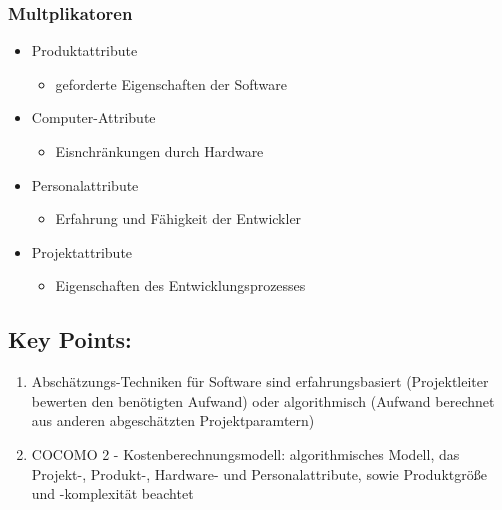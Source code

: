 \subsubsection{Multplikatoren}
\begin{itemize}
    \item Produktattribute
    \begin{itemize}
        \item geforderte Eigenschaften der Software 
    \end{itemize}
    \item Computer-Attribute
    \begin{itemize}
        \item Eisnchränkungen durch Hardware
    \end{itemize}
    \item Personalattribute
    \begin{itemize}
        \item Erfahrung und Fähigkeit der Entwickler
    \end{itemize}
    \item Projektattribute 
    \begin{itemize}
        \item Eigenschaften des Entwicklungsprozesses
    \end{itemize}
\end{itemize}

\subsection{Key Points:}
\begin{enumerate}
    \item Abschätzungs-Techniken für Software sind erfahrungsbasiert (Projektleiter bewerten den benötigten Aufwand) oder algorithmisch (Aufwand berechnet aus anderen abgeschätzten Projektparamtern)
    \item COCOMO 2 - Kostenberechnungsmodell: algorithmisches Modell, das Projekt-, Produkt-, Hardware- und Personalattribute, sowie Produktgröße und -komplexität beachtet
\end{enumerate}
